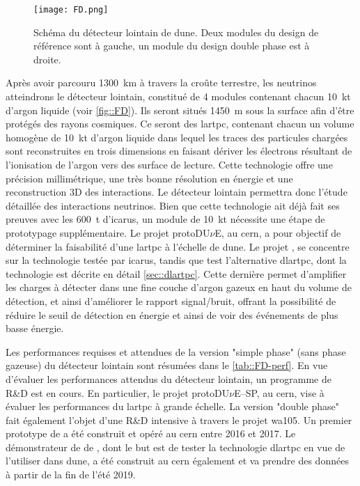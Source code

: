         \begin{figure}[htbp]
          \centering
          \texttt{[image: FD.png]}
          \caption[Schéma du détecteur lointain de DU$\nu$E]{\label{fig::FD}Schéma du détecteur lointain de \gls{dune}. Deux modules du design de référence sont à gauche, un module du design double phase est à droite.}
        \end{figure}
        Après avoir parcouru \SI{1300}{\kilo\meter} à travers la croûte terrestre, les neutrinos atteindrons le détecteur lointain, constitué de 4 modules contenant chacun \SI{10}{\kilo\tonne} d'argon liquide (voir \autoref{fig::FD}). Ils seront situés \SI{1450}{\meter} sous la surface afin d'être protégés des rayons cosmiques. Ce seront des \acrfull{lartpc}, contenant chacun un volume homogène de \SI{10}{\kilo\tonne} d'argon liquide dans lequel les traces des particules chargées sont reconstruites en trois dimensions en faisant dériver les électrons résultant de l'ionisation de l'argon vers des surface de lecture. Cette technologie offre une précision millimétrique, une très bonne résolution en énergie et une reconstruction 3D des interactions. Le détecteur lointain permettra donc l'étude détaillée des interactions neutrinos. Bien que cette technologie ait déjà fait ses preuves avec les \SI{600}{\tonne} d'\gls{icarus}, un module de \SI{10}{\kilo\tonne} nécessite une étape de prototypage supplémentaire. Le projet protoDU$\nu$E, au \gls{cern}, a pour objectif de déterminer la faisabilité d'une \gls{lartpc} à l'échelle de \gls{dune}. Le projet \protosp{}, se concentre sur la technologie testée par \gls{icarus}, tandis que \protodp{} test l'alternative \gls{dlartpc}, dont la technologie est décrite en détail \autoref{sec::dlartpc}. Cette dernière permet d'amplifier les charges à détecter dans une fine couche d'argon gazeux en haut du volume de détection, et ainsi d'améliorer le rapport signal/bruit, offrant la possibilité de réduire le seuil de détection en énergie et ainsi de voir des événements de plus basse énergie. 

        Les performances requises et attendues de la version "simple phase" (sans phase gazeuse) du détecteur lointain sont résumées dans le \autoref{tab::FD-perf}. En vue d'évaluer les performances attendus du détecteur lointain, un programme de R\&D est en cours. En particulier, le projet protoDU$\nu$E--SP, au \gls{cern}, vise à évaluer les performances du \gls{lartpc} à grande échelle. La version "double phase" fait également l'objet d'une R\&D intensive à travers le projet \gls{wa105}. Un premier prototype de \TOO{} a été construit et opéré au \gls{cern} entre 2016 et 2017. Le démonstrateur de \SSS{} de \protodp{}, dont le but est de tester la technologie \gls{dlartpc} en vue de l'utiliser dans \gls{dune}, a été construit au \gls{cern} également et va prendre des données à partir de la fin de l'été 2019.

